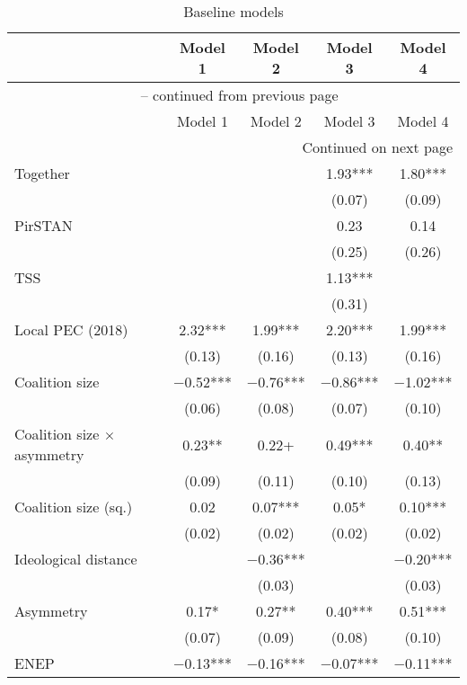 \begin{longtable}{lcccc}
\caption{Baseline models}\\
\toprule
  & Model 1 & Model 2 & Model 3 & Model 4\\
\midrule
\endfirsthead

\multicolumn{5}{c}{{\tablename\ \thetable{} -- continued from previous page}} \\
\toprule
  & Model 1 & Model 2 & Model 3 & Model 4\\
\midrule
\endhead

\bottomrule
\multicolumn{5}{r}{{Continued on next page}} \\
\endfoot

\bottomrule
\endlastfoot

Together &  &  & \num{1.93}*** & \num{1.80}***\\
 &  &  & (\num{0.07}) & (\num{0.09})\\
PirSTAN &  &  & \num{0.23} & \num{0.14}\\
 &  &  & (\num{0.25}) & (\num{0.26})\\
TSS &  &  & \num{1.13}*** & \\
 &  &  & (\num{0.31}) & \\
Local PEC (2018) & \num{2.32}*** & \num{1.99}*** & \num{2.20}*** & \num{1.99}***\\
 & (\num{0.13}) & (\num{0.16}) & (\num{0.13}) & (\num{0.16})\\
Coalition size & \num{-0.52}*** & \num{-0.76}*** & \num{-0.86}*** & \num{-1.02}***\\
 & (\num{0.06}) & (\num{0.08}) & (\num{0.07}) & (\num{0.10})\\
Coalition size $\times$ asymmetry & \num{0.23}** & \num{0.22}+ & \num{0.49}*** & \num{0.40}**\\
 & (\num{0.09}) & (\num{0.11}) & (\num{0.10}) & (\num{0.13})\\
Coalition size (sq.) & \num{0.02} & \num{0.07}*** & \num{0.05}* & \num{0.10}***\\
 & (\num{0.02}) & (\num{0.02}) & (\num{0.02}) & \vphantom{1} (\num{0.02})\\
Ideological distance &  & \num{-0.36}*** &  & \num{-0.20}***\\
 &  & (\num{0.03}) &  & (\num{0.03})\\
Asymmetry & \num{0.17}* & \num{0.27}** & \num{0.40}*** & \num{0.51}***\\
 & (\num{0.07}) & (\num{0.09}) & (\num{0.08}) & (\num{0.10})\\
ENEP & \num{-0.13}*** & \num{-0.16}*** & \num{-0.07}*** & \num{-0.11}***\\

\end{longtable}
